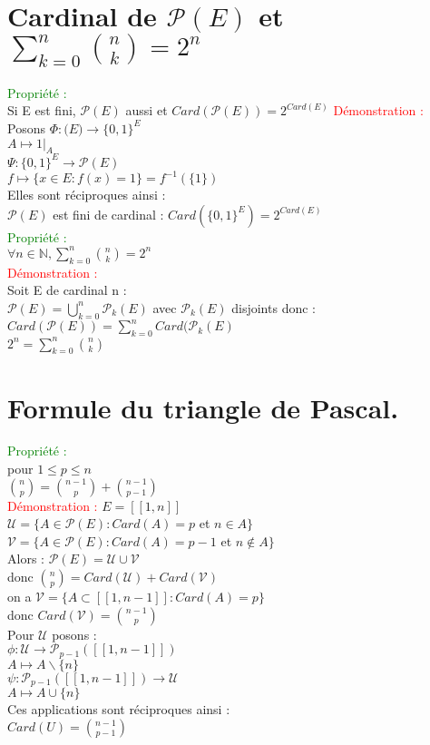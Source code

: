 \documentclass{article}
\begin{document}
\section{Cardinal de $\mathcal P (E)$ et $\sum_{k=0}^n \binom{n}{k}=2^n$ }
\textcolor{green}{Propriété :} \\
Si E est fini, $\mathcal P(E)$ aussi et $Card(\mathcal P(E))=2^{Card(E)}$
\textcolor{red}{Démonstration :} \\
Posons $\Phi : \mathcal (E) \rightarrow \lbrace 0,1 \rbrace^E$ \\
$A \mapsto 1|_{A}$ \\
$\Psi : \lbrace 0,1 \rbrace^E \rightarrow \mathcal P(E)$ \\
$f \mapsto \lbrace x \in E : f(x)=1 \rbrace=f^{-1}(\lbrace 1 \rbrace)$ \\
Elles sont réciproques ainsi : \\
$ \mathcal P(E)$ est fini de cardinal : $Card(\lbrace 0,1 \rbrace^E)=2^{Card(E)} $ \\
\textcolor{green}{Propriété :} \\
$\forall n \in \mathbb N, \sum_{k=0}^n \binom{n}{k}=2^n$ \\
\textcolor{red}{Démonstration :} \\
Soit E de cardinal n : \\
$\mathcal P(E)= \bigcup_{k=0}^n \mathcal P_k(E)$ avec $\mathcal P_k(E)$ disjoints donc : \\
$Card(\mathcal P(E))=\sum_{k=0}^n Card(\mathcal P_k(E)$ \\
$2^n=\sum_{k=0}^n \binom{n}{k}$
\section{Formule du triangle de Pascal.}
\textcolor{green}{Propriété :} \\
pour $1 \leq p \leq n$ \\
$\binom{n}{p}=\binom{n-1}{p} +\binom{n-1}{p-1}$ \\
\textcolor{red}{Démonstration :}
$E=[[1,n]]$ \\
$\mathcal U= \lbrace A \in \mathcal P(E): Card(A)=p$ et $n\in A \rbrace$ \\
$\mathcal V= \lbrace A \in \mathcal P(E) : Card(A)=p-1$ et $n \notin A \rbrace$ \\
Alors : $\mathcal P(E)= \mathcal U \cup \mathcal V$ \\
donc $\binom{n}{p}= Card(\mathcal  U) + Card(\mathcal V)$ \\
on a $\mathcal V= \lbrace A \subset [[1,n-1]] : Card(A)=p \rbrace $ \\
donc $Card(\mathcal V)=\binom{n-1}{p}$ \\
Pour $\mathcal U$ posons : \\
$\phi : \mathcal U \rightarrow \mathcal P_{p-1}([[1,n-1]])$ \\
$A \mapsto A \backslash \lbrace n \rbrace$ \\
$\psi : \mathcal P_{p-1}([[1,n-1]])\rightarrow \mathcal U$ \\
$A \mapsto A \cup \lbrace n \rbrace $ \\
Ces applications sont réciproques ainsi : \\
$Card(U)= \binom{n-1}{p-1}$
\end{document}
